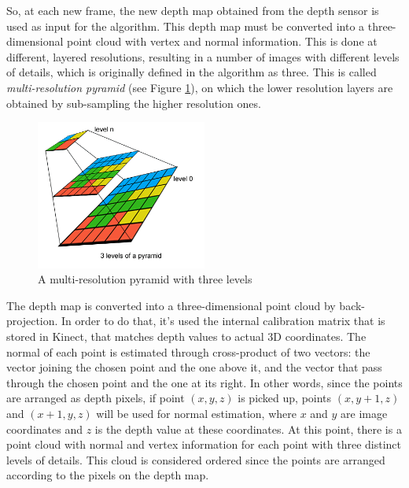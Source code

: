 \documentclass[msc, a4paper, classic, en]{ufbathesis}
\begin{document}
So, at each new frame, the new depth map obtained from the depth sensor is used as input for the algorithm. This depth map must be converted into a three-dimensional point cloud with vertex and normal information. This is done at different, layered resolutions, resulting in a number of images with different levels of details, which is originally defined in the algorithm as three. This is called \textit{multi-resolution pyramid} (see Figure \ref{fig:pyr}), on which the lower resolution layers are obtained by sub-sampling the higher resolution ones.

\begin{figure}
\label{fig:pyr}
\centering
\includegraphics[width=0.5\textwidth]{images/pyr.png}
\caption{A multi-resolution pyramid with three levels \cite{michele}}
\end{figure}

The depth map is converted into a three-dimensional point cloud by back-projection. In order to do that, it's used the internal calibration matrix that is stored in Kinect, that matches depth values to actual 3D coordinates. The normal of each point is estimated through cross-product of two vectors: the vector joining the chosen point and the one above it, and the vector that pass through the chosen point and the one at its right. In other words, since the points are arranged as depth pixels, if point $(x, y, z)$ is picked up, points $(x, y+1, z)$ and $(x+1, y, z)$ will be used for normal estimation, where $x$ and $y$ are image coordinates and $z$ is the depth value at these coordinates. At this point, there is a point cloud with normal and vertex information for each point with three distinct levels of details. This cloud is considered ordered since the points are arranged according to the pixels on the depth map.
\end{document}

